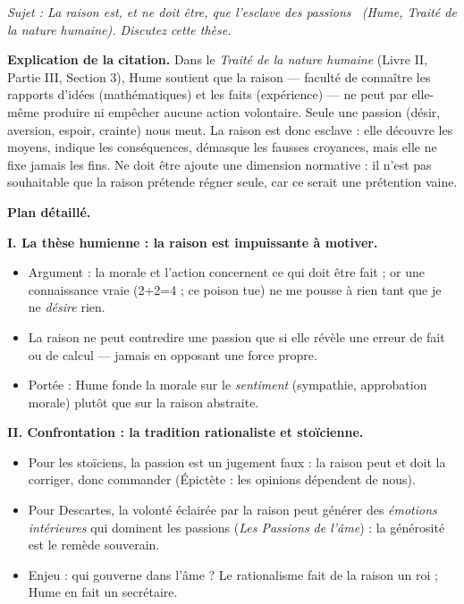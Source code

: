 \documentclass[11pt]{article}
\begin{document}
\begin{corrige}

\emph{Sujet : \guillemotleft La raison est, et ne doit être, que l'esclave des passions \guillemotright\ (Hume, \emph{Traité de la nature humaine}). Discutez cette thèse.}

\textbf{Explication de la citation.} Dans le \emph{Traité de la nature humaine} (Livre II, Partie III, Section 3), Hume soutient que la raison — faculté de connaître les rapports d'idées (mathématiques) et les faits (expérience) — ne peut par elle-même produire ni empêcher aucune action volontaire. Seule une passion (désir, aversion, espoir, crainte) nous meut. La raison est donc \guillemotleft esclave \guillemotright{} : elle découvre les moyens, indique les conséquences, démasque les fausses croyances, mais elle ne fixe jamais les fins. \guillemotleft Ne doit être \guillemotright{} ajoute une dimension normative : il n'est pas souhaitable que la raison prétende régner seule, car ce serait une prétention vaine.

\textbf{Plan détaillé.}

\textbf{I. La thèse humienne : la raison est impuissante à motiver.}
\begin{itemize}
\item Argument : la morale et l'action concernent ce qui doit être fait ; or une connaissance vraie (2+2=4 ; ce poison tue) ne me pousse à rien tant que je ne \emph{désire} rien.
\item La raison ne peut contredire une passion que si elle révèle une erreur de fait ou de calcul — jamais en opposant une force propre.
\item Portée : Hume fonde la morale sur le \emph{sentiment} (sympathie, approbation morale) plutôt que sur la raison abstraite.
\end{itemize}

\textbf{II. Confrontation : la tradition rationaliste et stoïcienne.}
\begin{itemize}
\item Pour les stoïciens, la passion est un jugement faux : la raison peut et doit la corriger, donc commander (Épictète : les opinions dépendent de nous).
\item Pour Descartes, la volonté éclairée par la raison peut générer des \emph{émotions intérieures} qui dominent les passions (\emph{Les Passions de l'âme}) : la générosité est le remède souverain.
\item Enjeu : qui gouverne dans l'âme ? Le rationalisme fait de la raison un roi ; Hume en fait un secrétaire.
\end{itemize}


\end{corrige}
\end{document}
